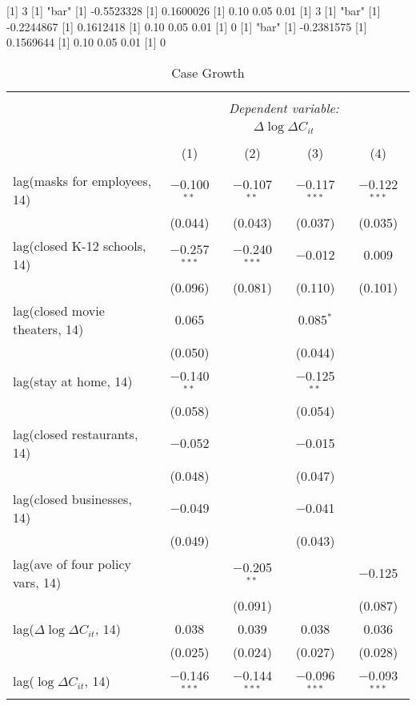 [1] 3
[1] "bar"
[1] -0.5523328
[1] 0.1600026
[1] 0.10 0.05 0.01
[1] 3
[1] "bar"
[1] -0.2244867
[1] 0.1612418
[1] 0.10 0.05 0.01
[1] 0
[1] "bar"
[1] -0.2381575
[1] 0.1569644
[1] 0.10 0.05 0.01
[1] 0

\begin{table}[!htbp] \centering 
  \caption{Case Growth} 
  \label{} 
\begin{tabular}{@{\extracolsep{1pt}}lcccc} 
\\[-1.8ex]\hline 
\hline \\[-1.8ex] 
 & \multicolumn{4}{c}{\textit{Dependent variable:}} \\ 
\cline{2-5} 
 & \multicolumn{4}{c}{$\Delta \log \Delta C_{it}$} \\ 
\\[-1.8ex] & (1) & (2) & (3) & (4)\\ 
\hline \\[-1.8ex] 
 lag(masks for employees, 14) & $-$0.100$^{**}$ & $-$0.107$^{**}$ & $-$0.117$^{***}$ & $-$0.122$^{***}$ \\ 
  & (0.044) & (0.043) & (0.037) & (0.035) \\ 
  lag(closed K-12 schools, 14) & $-$0.257$^{***}$ & $-$0.240$^{***}$ & $-$0.012 & 0.009 \\ 
  & (0.096) & (0.081) & (0.110) & (0.101) \\ 
  lag(closed movie theaters, 14) & 0.065 &  & 0.085$^{*}$ &  \\ 
  & (0.050) &  & (0.044) &  \\ 
  lag(stay at home, 14) & $-$0.140$^{**}$ &  & $-$0.125$^{**}$ &  \\ 
  & (0.058) &  & (0.054) &  \\ 
  lag(closed restaurants, 14) & $-$0.052 &  & $-$0.015 &  \\ 
  & (0.048) &  & (0.047) &  \\ 
  lag(closed businesses, 14) & $-$0.049 &  & $-$0.041 &  \\ 
  & (0.049) &  & (0.043) &  \\ 
  lag(ave of four policy vars, 14) &  & $-$0.205$^{**}$ &  & $-$0.125 \\ 
  &  & (0.091) &  & (0.087) \\ 
  lag($\Delta \log \Delta C_{it}$, 14) & 0.038 & 0.039 & 0.038 & 0.036 \\ 
  & (0.025) & (0.024) & (0.027) & (0.028) \\ 
  lag($\log \Delta C_{it}$, 14) & $-$0.146$^{***}$ & $-$0.144$^{***}$ & $-$0.096$^{***}$ & $-$0.093$^{***}$ \\ 

\end{tabular}
\end{table}

